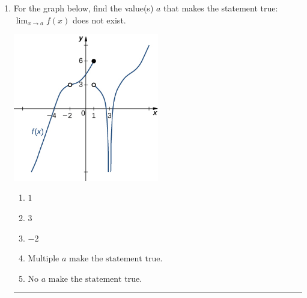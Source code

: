 \documentclass[14pt]{extbook}
\newcommand{\litem}[1]{\item#1\hspace*{-1cm}\rule{\textwidth}{0.4pt}}
\begin{document}
\begin{enumerate}
{\begin{enumerate}[label=\Alph*.]
\end{enumerate} }
\litem{
For the graph below, find the value(s) $a$ that makes the statement true: $ \displaystyle \lim_{x \rightarrow a} f(x)$ does not exist.
\begin{center}
    \includegraphics[width=0.5\textwidth]{../Figures/evaluateLimitGraphicallyB.png}
\end{center}
\begin{enumerate}[label=\Alph*.]
\item \( 1 \)
\item \( 3 \)
\item \( -2 \)
\item \( \text{Multiple } a \text{ make the statement true}. \)
\item \( \text{No } a \text{ make the statement true}. \)

\end{enumerate} }
\end{enumerate}
\end{document}
